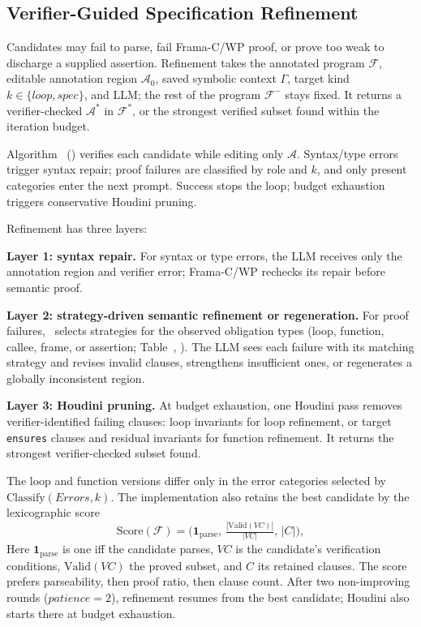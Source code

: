 \subsection{Verifier-Guided Specification Refinement}
\label{sec:refinement}

Candidates may fail to parse, fail Frama-C/WP proof, or prove too weak to discharge a supplied assertion. Refinement takes the annotated program $\mathcal F$, editable annotation region $\mathcal A_0$, saved symbolic context $\Gamma$, target kind $k\in\{\textit{loop},\textit{spec}\}$, and LLM; the rest of the program $\mathcal F^{-}$ stays fixed. It returns a verifier-checked $\mathcal A^*$ in $\mathcal F^*$, or the strongest verified subset found within the iteration budget.

Algorithm~ () verifies each candidate while editing only $\mathcal A$. Syntax/type errors trigger syntax repair; proof failures are classified by role and $k$, and only present categories enter the next prompt. Success stops the loop; budget exhaustion triggers conservative Houdini pruning.

Refinement has three layers:


\textbf{Layer 1: syntax repair.}
For syntax or type errors, the LLM receives only the annotation region and verifier error; Frama-C/WP rechecks its repair before semantic proof.

\textbf{Layer 2: strategy-driven semantic refinement or regeneration.}
For proof failures, \toolname\ selects strategies for the observed obligation types (loop, function, callee, frame, or assertion; Table~, ). The LLM sees each failure with its matching strategy and revises invalid clauses, strengthens insufficient ones, or regenerates a globally inconsistent region.

\textbf{Layer 3: Houdini pruning.}
At budget exhaustion, one Houdini pass removes verifier-identified failing clauses: loop invariants for loop refinement, or target \texttt{ensures} clauses and residual invariants for function refinement. It returns the strongest verifier-checked subset found.

The loop and function versions differ only in the error categories selected by $\mathrm{Classify}(\mathit{Errors},k)$. The implementation also retains the best candidate by the lexicographic score
\[
\mathrm{Score}(\mathcal{F}) =
\big(\mathbf{1}_{\mathrm{parse}},\,
\tfrac{|\mathrm{Valid}(\mathit{VC})|}{|\mathit{VC}|},\,
|C|\big),
\]
Here $\mathbf{1}_{\mathrm{parse}}$ is one iff the candidate parses, $\mathit{VC}$ is the candidate's verification conditions, $\mathrm{Valid}(\mathit{VC})$ the proved subset, and $C$ its retained clauses. The score prefers parseability, then proof ratio, then clause count. After two non-improving rounds ($\textit{patience}=2$), refinement resumes from the best candidate; Houdini also starts there at budget exhaustion.

